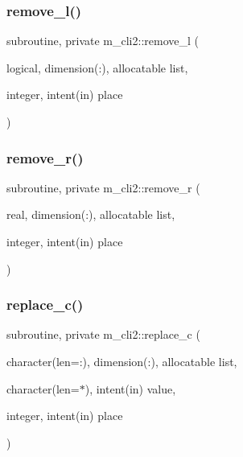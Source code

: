 \mbox{\label{namespacem__cli2_ae3fc38d25a8a4892bde95a7198c2495a}} 
\subsubsection{\texorpdfstring{remove\+\_\+l()}{remove\_l()}}
{\footnotesize\ttfamily subroutine, private m\+\_\+cli2\+::remove\+\_\+l (\begin{DoxyParamCaption}\item[{logical, dimension(\+:), allocatable}]{list,  }\item[{integer, intent(in)}]{place }\end{DoxyParamCaption})\hspace{0.3cm}{\ttfamily [private]}}

\mbox{\label{namespacem__cli2_a281edafaa6f74c30bd8de6d0c1d05be6}} 
\subsubsection{\texorpdfstring{remove\+\_\+r()}{remove\_r()}}
{\footnotesize\ttfamily subroutine, private m\+\_\+cli2\+::remove\+\_\+r (\begin{DoxyParamCaption}\item[{real, dimension(\+:), allocatable}]{list,  }\item[{integer, intent(in)}]{place }\end{DoxyParamCaption})\hspace{0.3cm}{\ttfamily [private]}}

\mbox{\label{namespacem__cli2_affd644ac84d1010b40748f80d142d6b3}} 
\subsubsection{\texorpdfstring{replace\+\_\+c()}{replace\_c()}}
{\footnotesize\ttfamily subroutine, private m\+\_\+cli2\+::replace\+\_\+c (\begin{DoxyParamCaption}\item[{character(len=\+:), dimension(\+:), allocatable}]{list,  }\item[{character(len=$\ast$), intent(in)}]{value,  }\item[{integer, intent(in)}]{place }\end{DoxyParamCaption})\hspace{0.3cm}{\ttfamily [private]}}



